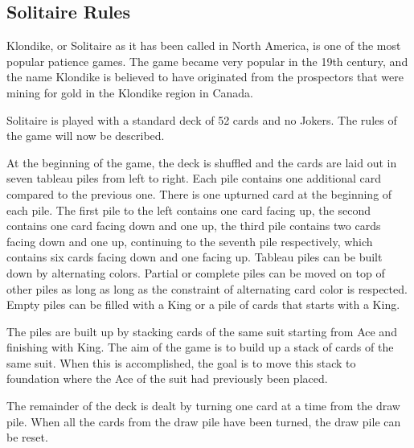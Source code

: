 \documentclass[runningheads,a4paper]{llncs}
\begin{document}
\subsection{Solitaire Rules}
\label{sec1:solitaire_rules}
Klondike, or Solitaire as it has been called in North America, is one of the most popular patience games.
\newline
 The game became very popular in the 19th century, and the name Klondike is believed to have originated from the prospectors that were mining for gold in the Klondike region in Canada.
 \newline
 
Solitaire is played with a standard deck of 52 cards and no Jokers.
The rules of the game will now be described.
\newline

 At the beginning of the game, the deck is shuffled and the cards are laid out in seven tableau piles from left to right. Each pile contains one additional card compared to the previous one. 
 There is one upturned card at the beginning of each pile. The first pile to the left contains one card facing up, the second contains one card facing down and one up, the third pile contains two cards facing down and one up, continuing to the seventh pile respectively, which contains six cards facing down and one facing up.
 Tableau piles can be built down by alternating colors. Partial or complete piles can be moved on top of other piles as long as long as the constraint of alternating card color is respected. 
 Empty piles can be filled with a King or a pile of cards that starts with a King.
\newline
 
The piles are built up by stacking cards of the same suit starting from Ace and finishing with King. The aim of the game is to build up a stack of cards of the same suit. When this is accomplished, the goal is to move this stack to foundation where the Ace of the suit had previously been placed. 
\newline
  
The remainder of the deck is dealt by turning one card at a time from the draw pile.
When all the cards from the draw pile have been turned, the draw pile can be reset. 
 
\end{document}
